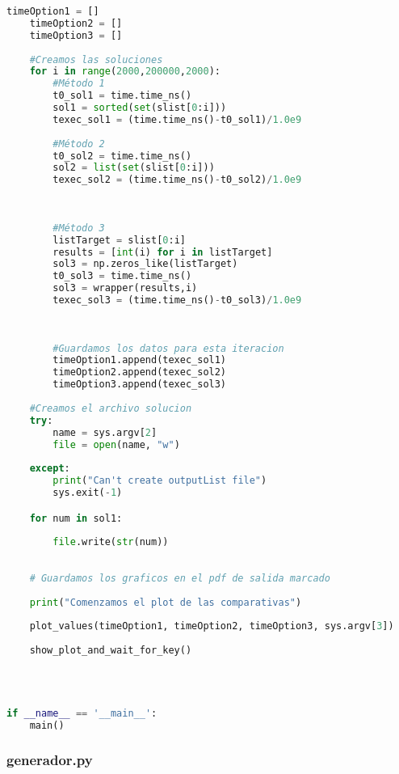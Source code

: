 \documentclass[10pt,journal,compsoc]{IEEEtran}
\begin{document}
\begin{lstlisting}[basicstyle=\tiny, language=Python]
    timeOption1 = []
    timeOption2 = []
    timeOption3 = []
    
    #Creamos las soluciones
    for i in range(2000,200000,2000):
        #Método 1
        t0_sol1 = time.time_ns()
        sol1 = sorted(set(slist[0:i]))
        texec_sol1 = (time.time_ns()-t0_sol1)/1.0e9
        
        #Método 2
        t0_sol2 = time.time_ns()
        sol2 = list(set(slist[0:i]))
        texec_sol2 = (time.time_ns()-t0_sol2)/1.0e9
        
        
        
        #Método 3
        listTarget = slist[0:i]
        results = [int(i) for i in listTarget]
        sol3 = np.zeros_like(listTarget)
        t0_sol3 = time.time_ns()
        sol3 = wrapper(results,i)
        texec_sol3 = (time.time_ns()-t0_sol3)/1.0e9
        
        
        
        #Guardamos los datos para esta iteracion
        timeOption1.append(texec_sol1)
        timeOption2.append(texec_sol2)
        timeOption3.append(texec_sol3)
    
    #Creamos el archivo solucion
    try:
        name = sys.argv[2]
        file = open(name, "w")
        
    except:
        print("Can't create outputList file")
        sys.exit(-1)

    for num in sol1:
        
        file.write(str(num))
       
        
    # Guardamos los graficos en el pdf de salida marcado
    
    print("Comenzamos el plot de las comparativas")
    
    plot_values(timeOption1, timeOption2, timeOption3, sys.argv[3])
    
    show_plot_and_wait_for_key()
    


 
if __name__ == '__main__':
    main()

\end{lstlisting}


\subsubsection{generador.py}
\end{document}
